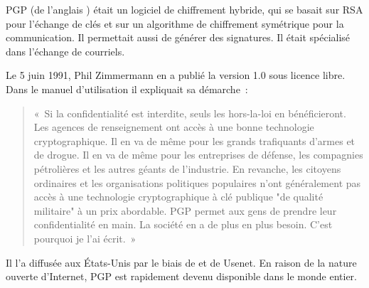 PGP (de l'anglais ) était un logiciel de chiffrement hybride, qui se basait sur RSA pour l'échange de clés et sur un algorithme de chiffrement symétrique pour la communication. Il permettait aussi de générer des signatures. Il était spécialisé dans l'échange de courriels.

Le 5 juin 1991, Phil Zimmermann en a publié la version 1.0 sous licence libre. Dans le manuel d'utilisation il expliquait sa démarche~:

\begin{quote}
«~Si la confidentialité est interdite, seuls les hors-la-loi en bénéficieront. Les agences de renseignement ont accès à une bonne technologie cryptographique. Il en va de même pour les grands trafiquants d'armes et de drogue. Il en va de même pour les entreprises de défense, les compagnies pétrolières et les autres géants de l'industrie. En revanche, les citoyens ordinaires et les organisations politiques populaires n'ont généralement pas accès à une technologie cryptographique à clé publique "de qualité militaire" à un prix abordable. PGP permet aux gens de prendre leur confidentialité en main. La société en a de plus en plus besoin. C'est pourquoi je l'ai écrit.~»
\end{quote} %


Il l'a diffusée aux États-Unis par le biais de  et de Usenet. En raison de la nature ouverte d'Internet, PGP est rapidement devenu disponible dans le monde entier.

